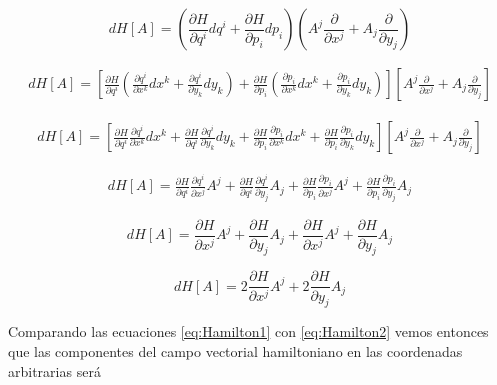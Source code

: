 \documentclass[a4paper,10pt]{article}
\numberwithin{equation}{section}
\begin{document}
\begin{equation}
 dH[A] = \left( \frac{\partial H}{\partial q^i}dq^i + \frac{\partial H}{\partial p_i}dp_i\right)
 \left(A^j\frac{\partial}{\partial x^j} + A_j \frac{\partial}{\partial y_j}\right)
\end{equation}

\begin{align}
 dH[A] = \left[ \frac{\partial H}{\partial q^i}\left(\frac{\partial q^i}{\partial x^k}dx^k + \frac{\partial q^i}{\partial y_k}dy_k  \right)
 + \frac{\partial H}{\partial p_i}\left(\frac{\partial p_i}{\partial x^k}dx^k + \frac{\partial p_i}{\partial y_k}dy_k  \right)\right]
 \left[A^j\frac{\partial}{\partial x^j} + A_j \frac{\partial}{\partial y_j}\right]
\end{align}

\begin{align}
 dH[A] = \left[ \frac{\partial H}{\partial q^i}\frac{\partial q^i}{\partial x^k}dx^k + \frac{\partial H}{\partial q^i}\frac{\partial q^i}{\partial y_k}dy_k
 + \frac{\partial H}{\partial p_i}\frac{\partial p_i}{\partial x^k}dx^k + \frac{\partial H}{\partial p_i}\frac{\partial p_i}{\partial y_k}dy_k \right]
 \left[A^j\frac{\partial}{\partial x^j} + A_j \frac{\partial}{\partial y_j}\right]
\end{align}

\begin{align}
 dH[A] = \frac{\partial H}{\partial q^i}\frac{\partial q^i}{\partial x^j}A^j + \frac{\partial H}{\partial q^i}\frac{\partial q^i}{\partial y_j}A_j
 + \frac{\partial H}{\partial p_i}\frac{\partial p_i}{\partial x^j}A^j + \frac{\partial H}{\partial p_i}\frac{\partial p_i}{\partial y_j}A_j 
\end{align}

\begin{equation}
 dH[A] =  \frac{\partial H}{\partial x^j}A^j + \frac{\partial H}{\partial y_j}A_j
 + \frac{\partial H}{\partial x^j}A^j + \frac{\partial H}{\partial y_j}A_j
\end{equation}

\begin{equation}
 dH[A] =  2\frac{\partial H}{\partial x^j}A^j + 2\frac{\partial H}{\partial y_j}A_j
 \label{eq:Hamilton2}
\end{equation}

Comparando las ecuaciones \eqref{eq:Hamilton1} con \eqref{eq:Hamilton2} vemos entonces 
que las componentes del campo vectorial hamiltoniano en las coordenadas arbitrarias será 
\end{document}
